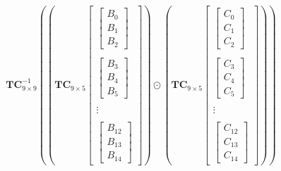 \documentclass[
11pt,notheorems,hyperref={pdfauthor=whatever}
]{beamer}
\begin{document}
\begin{frame}
    \[
    \mathbf{TC}_{9\times 9}^{-1}
    \left(
    \left(\mathbf{TC}_{9\times 5}
        \begin{bmatrix}
            \begin{bmatrix}
                B_{0} \\ B_{1} \\ B_{2} 
            \end{bmatrix} \\ \\
            \begin{bmatrix}
                B_{3} \\ B_{4} \\ B_{5}
            \end{bmatrix} \\ \\
            \vdots \\\\
            \begin{bmatrix}
                B_{12} \\ B_{13} \\ B_{14}
            \end{bmatrix}
        \end{bmatrix}\right)\odot
    \left(\mathbf{TC}_{9\times 5}
    \begin{bmatrix}
        \begin{bmatrix}
            C_{0} \\ C_{1} \\ C_{2} 
        \end{bmatrix} \\ \\
        \begin{bmatrix}
            C_{3} \\ C_{4} \\ C_{5}
        \end{bmatrix} \\ \\
        \vdots \\\\
        \begin{bmatrix}
            C_{12} \\ C_{13} \\ C_{14}
        \end{bmatrix}
    \end{bmatrix}\right)\right)
    \]
\end{frame}
\end{document}
